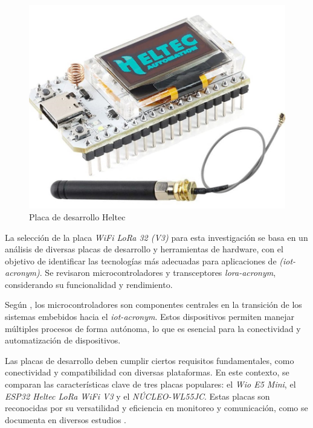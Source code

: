\begin{figure}[H]
\leavevmode
\begin{minipage}{\textwidth}
\begin{center}
\includegraphics[scale=0.25]{./capitulo_03/figures/HW/Heltec.jpg}
\caption{Placa de desarrollo Heltec\label{fig:heltec}}
\end{center}
\end{minipage}
\end{figure}

La selección de la placa \textit{WiFi LoRa 32 (V3)} para esta investigación se basa en un análisis de diversas placas de desarrollo y herramientas de hardware, con el objetivo de identificar las tecnologías más adecuadas para aplicaciones de \textit{(\acrshort{iot-acronym})}. Se revisaron microcontroladores y transceptores \textit{\acrshort{lora-acronym}}, considerando su funcionalidad y rendimiento.

Según \cite{Cherkaoui2021Review}, los microcontroladores son componentes centrales en la transición de los sistemas embebidos hacia el \textit{\acrshort{iot-acronym}}. Estos dispositivos permiten manejar múltiples procesos de forma autónoma, lo que es esencial para la conectividad y automatización de dispositivos.

Las placas de desarrollo deben cumplir ciertos requisitos fundamentales, como conectividad y compatibilidad con diversas plataformas. En este contexto, se comparan las características clave de tres placas populares: el \textit{Wio E5 Mini}, el \textit{ESP32 Heltec LoRa WiFi V3} y el \textit{NÚCLEO-WL55JC}. Estas placas son reconocidas por su versatilidad y eficiencia en monitoreo y comunicación, como se documenta en diversos estudios \cite{Latifov2023Design, Jengsriwong2023LoRaWAN}.

